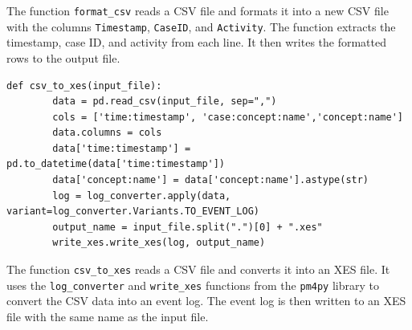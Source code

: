 The function \texttt{format\_csv} reads a CSV file and formats it into a new CSV file with the columns \texttt{Timestamp}, \texttt{CaseID}, and \texttt{Activity}. The function extracts the timestamp, case ID, and activity from each line. It then writes the formatted rows to the output file.



\begin{lstlisting}[caption={CSV to XES Conversion}]
    def csv_to_xes(input_file):
        data = pd.read_csv(input_file, sep=",")
        cols = ['time:timestamp', 'case:concept:name','concept:name']
        data.columns = cols
        data['time:timestamp'] = pd.to_datetime(data['time:timestamp'])
        data['concept:name'] = data['concept:name'].astype(str)
        log = log_converter.apply(data, variant=log_converter.Variants.TO_EVENT_LOG)
        output_name = input_file.split(".")[0] + ".xes"
        write_xes.write_xes(log, output_name)
    \end{lstlisting}

The function \texttt{csv\_to\_xes} reads a CSV file and converts it into an XES file. It uses the \texttt{log\_converter} and \texttt{write\_xes} functions from the \texttt{pm4py} library to convert the CSV data into an event log. The event log is then written to an XES file with the same name as the input file.